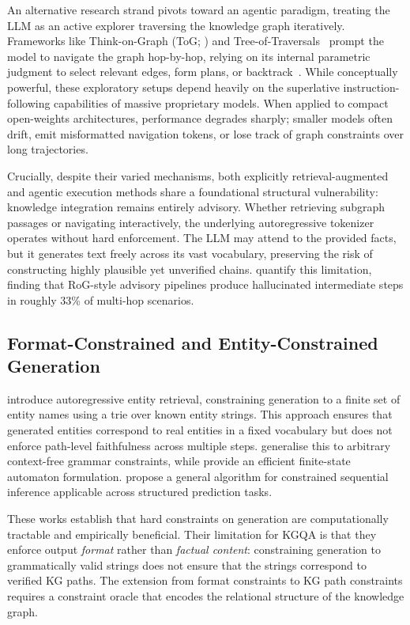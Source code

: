 An alternative research strand pivots toward an agentic paradigm, treating the LLM as an active explorer traversing the knowledge graph iteratively. Frameworks like Think-on-Graph (ToG; \citealt{sun2024tog}) and Tree-of-Traversals~\citep{markowitz2024tree} prompt the model to navigate the graph hop-by-hop, relying on its internal parametric judgment to select relevant edges, form plans, or backtrack~\citep{yao2022react}. While conceptually powerful, these exploratory setups depend heavily on the superlative instruction-following capabilities of massive proprietary models. When applied to compact open-weights architectures, performance degrades sharply; smaller models often drift, emit misformatted navigation tokens, or lose track of graph constraints over long trajectories.

Crucially, despite their varied mechanisms, both explicitly retrieval-augmented and agentic execution methods share a foundational structural vulnerability: knowledge integration remains entirely advisory. Whether retrieving subgraph passages or navigating interactively, the underlying autoregressive tokenizer operates without hard enforcement. The LLM may attend to the provided facts, but it generates text freely across its vast vocabulary, preserving the risk of constructing highly plausible yet unverified chains. \citet{luo2024gcr} quantify this limitation, finding that RoG-style advisory pipelines produce hallucinated intermediate steps in roughly 33\% of multi-hop scenarios.

\subsection{Format-Constrained and Entity-Constrained Generation}

\citet{decao2021autoregressive} introduce autoregressive entity retrieval, constraining generation to a finite set of entity names using a trie over known entity strings. This approach ensures that generated entities correspond to real entities in a fixed vocabulary but does not enforce path-level faithfulness across multiple steps. \citet{geng2023gcd} generalise this to arbitrary context-free grammar constraints, while \citet{willard2023outlines} provide an efficient finite-state automaton formulation. \citet{deutsch2019constrained} propose a general algorithm for constrained sequential inference applicable across structured prediction tasks.

These works establish that hard constraints on generation are computationally tractable and empirically beneficial. Their limitation for KGQA is that they enforce output \textit{format} rather than \textit{factual content}: constraining generation to grammatically valid strings does not ensure that the strings correspond to verified KG paths. The extension from format constraints to KG path constraints requires a constraint oracle that encodes the relational structure of the knowledge graph.


